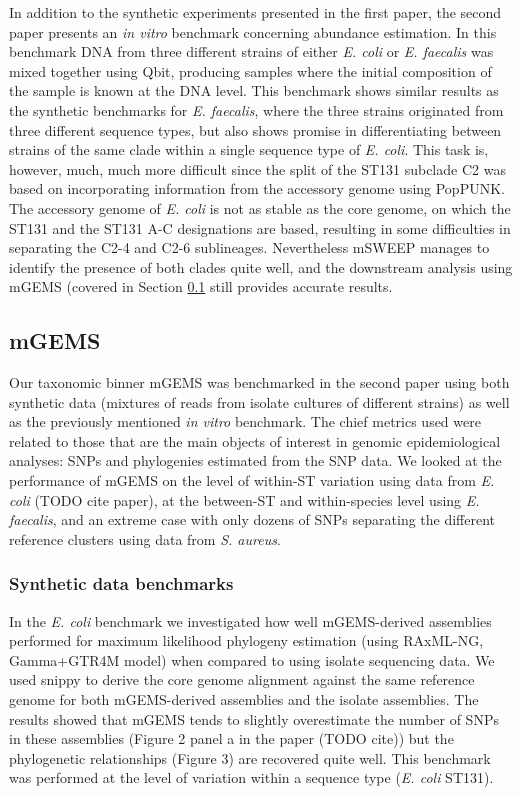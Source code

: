 \documentclass[officiallayout]{tktla}
\begin{document}
In addition to the synthetic experiments presented in the first paper,
the second paper presents an \textit{in vitro} benchmark concerning
abundance estimation. In this benchmark DNA from three different
strains of either \textit{E. coli} or \textit{E. faecalis} was mixed
together using Qbit, producing samples where the initial composition
of the sample is known at the DNA level. This benchmark shows similar
results as the synthetic benchmarks for \textit{E. faecalis}, where
the three strains originated from three different sequence types, but
also shows promise in differentiating between strains of the same
clade within a single sequence type of \textit{E. coli}. This task is,
however, much, much more difficult since the split of the ST131
subclade C2 was based on incorporating information from the accessory
genome using PopPUNK. The accessory genome of \textit{E. coli} is not
as stable as the core genome, on which the ST131 and the ST131 A-C
designations are based, resulting in some difficulties in separating
the C2-4 and C2-6 sublineages. Nevertheless mSWEEP manages to identify
the presence of both clades quite well, and the downstream analysis
using mGEMS (covered in Section \ref{mgems-performance-benchmark}
still provides accurate results.

\subsection{mGEMS}
\label{mgems-performance-benchmark}

Our taxonomic binner mGEMS was benchmarked in the second paper using
both synthetic data (mixtures of reads from isolate cultures of
different strains) as well as the previously mentioned \textit{in
  vitro} benchmark. The chief metrics used were related to those that
are the main objects of interest in genomic epidemiological analyses:
SNPs and phylogenies estimated from the SNP data. We looked at the
performance of mGEMS on the level of within-ST variation using data
from \textit{E. coli} (TODO cite paper), at the between-ST and
within-species level using \textit{E. faecalis}, and an extreme case
with only dozens of SNPs separating the different reference clusters
using data from \textit{S. aureus}.

\subsubsection{Synthetic data benchmarks}

In the \textit{E. coli} benchmark we investigated how well
mGEMS-derived assemblies performed for maximum likelihood phylogeny
estimation (using RAxML-NG, Gamma+GTR4M model) when compared to using
isolate sequencing data. We used snippy to derive the core genome
alignment against the same reference genome for both mGEMS-derived
assemblies and the isolate assemblies. The results showed that mGEMS
tends to slightly overestimate the number of SNPs in these assemblies
(Figure 2 panel a in the paper (TODO cite)) but the phylogenetic
relationships (Figure 3) are recovered quite well. This benchmark was
performed at the level of variation within a sequence type
(\textit{E. coli} ST131).
\end{document}
